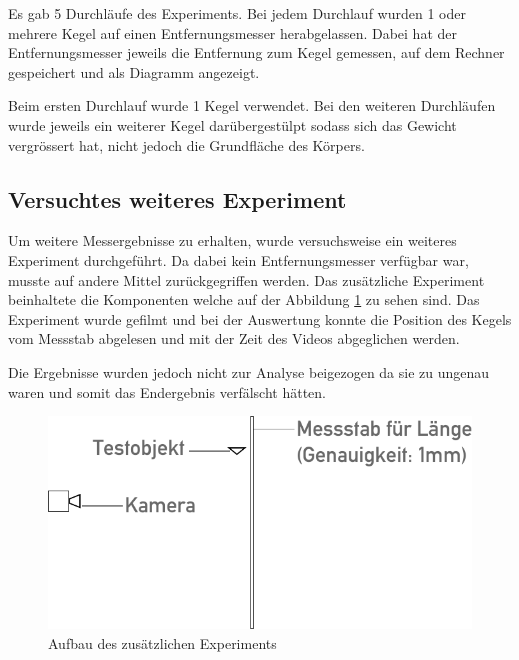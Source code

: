 Es gab 5 Durchläufe des Experiments. Bei jedem Durchlauf wurden 1 oder mehrere Kegel auf einen Entfernungsmesser herabgelassen. Dabei hat der Entfernungsmesser jeweils die Entfernung zum Kegel gemessen, auf dem Rechner gespeichert und als Diagramm angezeigt.

Beim ersten Durchlauf wurde 1 Kegel verwendet. Bei den weiteren Durchläufen wurde jeweils ein weiterer Kegel darübergestülpt sodass sich das Gewicht vergrössert hat, nicht jedoch die Grundfläche des Körpers.



\subsection{Versuchtes weiteres Experiment}

Um weitere Messergebnisse zu erhalten, wurde versuchsweise ein weiteres Experiment durchgeführt. Da dabei kein Entfernungsmesser verfügbar war, musste auf andere Mittel zurückgegriffen werden. Das zusätzliche Experiment beinhaltete die Komponenten welche auf der Abbildung \ref{fig:addexp} zu sehen sind. Das Experiment wurde gefilmt und bei der Auswertung konnte die Position des Kegels vom Messstab abgelesen und mit der Zeit des Videos abgeglichen werden.

Die Ergebnisse wurden jedoch nicht zur Analyse beigezogen da sie zu ungenau waren und somit das Endergebnis verfälscht hätten.

\begin{figure}
	\center
	\includegraphics{diagrams/aufbau2}
	\caption{\label{fig:addexp} Aufbau des zusätzlichen Experiments}
\end{figure}